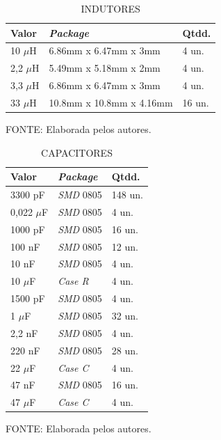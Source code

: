 \documentclass[
	12pt,				%
	openright,			%
	oneside,			%
	a4paper,			%
	english,			%
	french,				%
	spanish,			%
	brazil,				%
	oldfontcommands
	]{abntex2}
\begin{document}
	\begin{table}[th]
	\caption{INDUTORES}
	\label{Tab_Indutores}
	\centering
		\begin{tabular}{p{1.5cm}|p{5.5cm}|p{1.2cm}}
			\textbf{Valor} & \textbf{\textit{Package}} & \textbf{Qtdd.}\\
			\hline
			10 $ \mu $H & 6.86mm x 6.47mm x 3mm & 4 un.\\
			2,2 $ \mu $H & 5.49mm x 5.18mm x 2mm & 4 un.\\
			3,3 $ \mu $H & 6.86mm x 6.47mm x 3mm & 4 un.\\
			33 $ \mu $H & 10.8mm x 10.8mm x 4.16mm & 16 un.\\
		\end{tabular}	
	
	\begin{small}
	\vspace{3pt}
		FONTE: Elaborada pelos autores.
	\end{small}
	\end{table}	
	
	\begin{table}[th]
	\caption{CAPACITORES}
	\label{Tab_Capacitores}
	\centering
		\begin{tabular}{p{2cm}|p{2cm}|p{1.3cm}}
			\textbf{Valor} & \textbf{\textit{Package}} & \textbf{Qtdd.}\\
			\hline
			3300 pF & \textit{SMD} 0805 & 148 un.\\
			0,022 $\mu$F & \textit{SMD} 0805 & 4 un.\\
			1000 pF & \textit{SMD} 0805 & 16 un.\\
			100 nF & \textit{SMD} 0805 & 12 un.\\
			10 nF & \textit{SMD} 0805 & 4 un.\\
			10 $\mu$F & \textit{Case R} & 4 un.\\
			1500 pF & \textit{SMD} 0805 & 4 un.\\
			1 $\mu$F & \textit{SMD} 0805 & 32 un.\\
			2,2 nF & \textit{SMD} 0805 & 4 un.\\
			220 nF & \textit{SMD} 0805 & 28 un.\\
			22 $\mu$F & \textit{Case C} & 4 un.\\
			47 nF & \textit{SMD} 0805 & 16 un.\\
			47 $\mu$F & \textit{Case C} & 4 un.\\
		\end{tabular}	
	
	\begin{small}
	\vspace{3pt}
		FONTE: Elaborada pelos autores.
	\end{small}
	\end{table}
	\pagebreak
\end{document}
